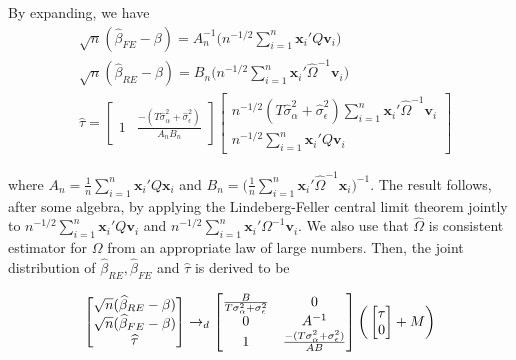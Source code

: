 \documentclass[11pt]{article}
\begin{document}
By expanding, we have 
\begin{align*}
&\sqrt{n} (\widehat{\beta}_{FE} - \beta) = A_n^{-1} \bigg ( n^{-1/2} \sum_{i=1}^n \mathbf{x}_i' Q \mathbf{v}_i  \bigg) \\
&\sqrt{n} (\widehat{\beta}_{RE} - \beta) = B_n \bigg (n^{-1/2} \sum_{i=1}^n \mathbf{x}_i' \widehat{\Omega}^{-1} \mathbf{v}_i  \bigg) \\
& \widehat{\tau} = \begin{bmatrix}
1 & \frac{-(T\widehat{\sigma}_\alpha^2 + \widehat{\sigma}_\epsilon^2)}{A_n B_n} 
\end{bmatrix} \begin{bmatrix}
n^{-1/2}(T\widehat{\sigma}_\alpha^2 + \widehat{\sigma}_\epsilon^2)\sum_{i=1}^n \mathbf{x}_i' \widehat{\Omega}^{-1} \mathbf{v}_i\\
n^{-1/2}\sum_{i=1}^n \mathbf{x}_i' Q \mathbf{v}_i
\end{bmatrix}
\end{align*}

where $A_n = \frac{1}{n} \sum_{i=1}^n \mathbf{x}_i' Q \mathbf{x}_i$ and $B_n = \big( \frac{1}{n} \sum_{i=1}^n \mathbf{x}_i' \widehat{\Omega}^{-1} \mathbf{x}_i \big)^{-1} $. The result follows, after some algebra, by applying the Lindeberg-Feller central limit theorem jointly to $n^{-1/2} \sum_{i=1}^n \mathbf{x}_i'Q\mathbf{v}_i$ and $n^{-1/2}\sum_{i=1}^n \mathbf{x}_i' \Omega^{-1} \mathbf{v}_i$. We also use that $\widehat{\Omega}$ is consistent estimator for $\Omega$ from an appropriate law of large numbers. Then, the joint distribution of $\widehat{\beta}_{RE}, \widehat{\beta}_{FE}$ and $\widehat{\tau}$ is derived to be

\[
 \begin{bmatrix}
\sqrt{n} (\widehat{\beta}_{RE} - \beta)\\
\sqrt{n} (\widehat{\beta}_{FE} - \beta)\\
\widehat{\tau}
\end{bmatrix} \rightarrow_d  \begin{bmatrix}
\frac{B}{T\sigma_\alpha^2 + \sigma_\epsilon^2} & 0 \\
0 & A^{-1} \\
1 & \frac{-(T\sigma_\alpha^2 + \sigma_\epsilon^2)}{AB}\\
\end{bmatrix} \bigg(\begin{bmatrix}
\tau\\
0
\end{bmatrix}   + M  \bigg)\\
\]
\end{document}
